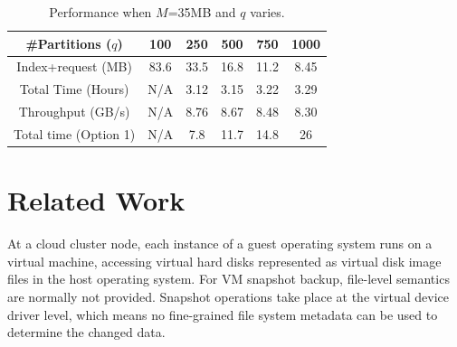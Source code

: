 \begin{table}[hbt]
\caption{ Performance when $M$=35MB and $q$ varies.}
\begin{center}
\begin{tabular} {|c|c|c|c|c|c|}
\hline \#Partitions ($q$)  & 100 & 250  & 500 &  750 &  1000 \\
\hline Index+request (MB) & 83.6 &  33.5 & 16.8 & 11.2 & 8.45 \\
\hline Total Time (Hours) & N/A&  3.12 & 3.15 & 3.22 & 3.29 \\
\hline Throughput (GB/s) & N/A &  8.76 & 8.67 & 8.48 & 8.30 \\
\hline Total time (Option 1) & N/A&  7.8& 11.7 & 14.8 & 26 \\
\hline
\end{tabular}
\end{center}
\label{tab:overall}
\end{table}


\section{Related Work}
\label{offline:related}
At a cloud cluster node, each instance of a guest operating system runs on a virtual machine, accessing virtual hard disks
represented as virtual disk image files in the host operating system.
For VM snapshot backup, file-level semantics are normally not provided.
Snapshot operations take place at the virtual device driver level, which means no fine-grained file system metadata can be used to determine the changed data.

